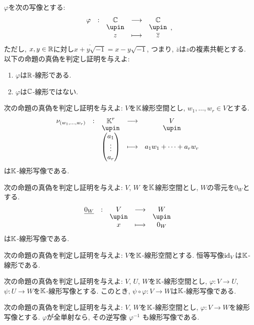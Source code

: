 \begin{quiz}
  $\varphi$を次の写像とする:
  \begin{align*}
    \shazo{\varphi}{\CC}{\CC}{z}{\overline{z}},
  \end{align*}
  ただし, 
  $x,y\in\mathbb{R}$に対し$\overline{x+y\sqrt{-1}}=x-y\sqrt{-1}$, つまり,
  $\overline{z}$は$z$の複素共軛とする.
  以下の命題の真偽を判定し証明を与えよ:
  \begin{enumerate}
  \item $\varphi$は$\mathbb{R}$-線形である.
  \item $\varphi$は$\mathbb{C}$-線形ではない.
  \end{enumerate}
\end{quiz}

\begin{quiz}
  次の命題の真偽を判定し証明を与えよ:
  $V$を$\mathbb{K}$線形空間とし,
  $w_1,\ldots,w_r\in V$とする.
    \begin{align*}
      \shazo{\nu_{(w_1,\ldots,w_r)}}{\KK^r}{V}
      {\begin{pmatrix}a_1\\\vdots\\a_r\end{pmatrix}}{a_1 w_1+\cdots+ a_r w_r}
    \end{align*}
    は$\mathbb{K}$-線形写像である.
\end{quiz}

\begin{quiz}
  次の命題の真偽を判定し証明を与えよ:
  $V$, $W$
  を$\mathbb{K}$線形空間とし,
  $W$の零元を$0_W$とする.
    \begin{align*}
      \shazo{\underline{0_W}}{V}{W}
      {x}{0_W}
    \end{align*}
  は$\mathbb{K}$-線形写像である.
\end{quiz}

\begin{quiz}
  次の命題の真偽を判定し証明を与えよ:
  $V$を$\mathbb{K}$-線形空間とする.
  恒等写像$\operatorname{id}_V$は$\mathbb{K}$-線形である.
\end{quiz}

\begin{quiz}
  次の命題の真偽を判定し証明を与えよ:
  $V$, $U$, $W$を$\mathbb{K}$-線形空間とし,
  $\varphi\colon V\to U$,
  $\psi\colon U\to W$を$\mathbb{K}$-線形写像とする.
  このとき, $\psi\circ\varphi\colon V\to W$は$\mathbb{K}$-線形写像である.
\end{quiz}

\begin{quiz}
  次の命題の真偽を判定し証明を与えよ:
  $V$, $W$を$\mathbb{K}$-線形空間とし,
  $\varphi\colon V \to W$を線形写像とする.
  $\varphi$が全単射なら,
  その逆写像
  $\varphi^{-1}$
  も線形写像である.
\end{quiz}

